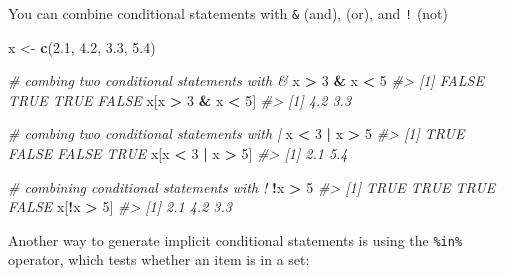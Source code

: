 \documentclass[]{book}
\newenvironment{Shaded}{\begin{snugshade}}{\end{snugshade}}
\newcommand{\KeywordTok}[1]{\textcolor[rgb]{0.13,0.29,0.53}{\textbf{#1}}}
\newcommand{\DecValTok}[1]{\textcolor[rgb]{0.00,0.00,0.81}{#1}}
\newcommand{\FloatTok}[1]{\textcolor[rgb]{0.00,0.00,0.81}{#1}}
\newcommand{\StringTok}[1]{\textcolor[rgb]{0.31,0.60,0.02}{#1}}
\newcommand{\CommentTok}[1]{\textcolor[rgb]{0.56,0.35,0.01}{\textit{#1}}}
\newcommand{\OperatorTok}[1]{\textcolor[rgb]{0.81,0.36,0.00}{\textbf{#1}}}
\newcommand{\NormalTok}[1]{#1}
\begin{document}
You can combine conditional statements with \texttt{\&} (and),
\texttt{\textbar{}} (or), and \texttt{!} (not)

\begin{Shaded}
\begin{Highlighting}[]
\NormalTok{x <-}\StringTok{ }\KeywordTok{c}\NormalTok{(}\FloatTok{2.1}\NormalTok{, }\FloatTok{4.2}\NormalTok{, }\FloatTok{3.3}\NormalTok{, }\FloatTok{5.4}\NormalTok{)}

\CommentTok{# combing two conditional statements with &}
\NormalTok{x }\OperatorTok{>}\StringTok{ }\DecValTok{3} \OperatorTok{&}\StringTok{ }\NormalTok{x }\OperatorTok{<}\StringTok{ }\DecValTok{5}
\CommentTok{#> [1] FALSE  TRUE  TRUE FALSE}
\NormalTok{x[x }\OperatorTok{>}\StringTok{ }\DecValTok{3} \OperatorTok{&}\StringTok{ }\NormalTok{x }\OperatorTok{<}\StringTok{ }\DecValTok{5}\NormalTok{]}
\CommentTok{#> [1] 4.2 3.3}

\CommentTok{# combing two conditional statements with |}
\NormalTok{x }\OperatorTok{<}\StringTok{ }\DecValTok{3} \OperatorTok{|}\StringTok{ }\NormalTok{x }\OperatorTok{>}\StringTok{ }\DecValTok{5} 
\CommentTok{#> [1]  TRUE FALSE FALSE  TRUE}
\NormalTok{x[x }\OperatorTok{<}\StringTok{ }\DecValTok{3} \OperatorTok{|}\StringTok{ }\NormalTok{x }\OperatorTok{>}\StringTok{ }\DecValTok{5}\NormalTok{]}
\CommentTok{#> [1] 2.1 5.4}

\CommentTok{# combining conditional statements with !}
\OperatorTok{!}\NormalTok{x }\OperatorTok{>}\StringTok{ }\DecValTok{5} 
\CommentTok{#> [1]  TRUE  TRUE  TRUE FALSE}
\NormalTok{x[}\OperatorTok{!}\NormalTok{x }\OperatorTok{>}\StringTok{ }\DecValTok{5}\NormalTok{]}
\CommentTok{#> [1] 2.1 4.2 3.3}
\end{Highlighting}
\end{Shaded}

Another way to generate implicit conditional statements is using the
\texttt{\%in\%} operator, which tests whether an item is in a set:

\begin{Shaded}
\end{Shaded}
\end{document}
